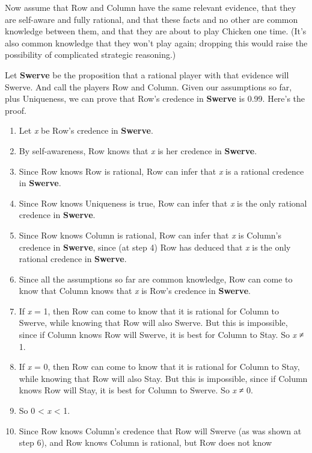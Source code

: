 \documentclass[
  12pt,
  letterpaper,
  DIV=11,
  numbers=noendperiod]{scrreprt}
\providecommand{\tightlist}{%
  \setlength{\itemsep}{0pt}\setlength{\parskip}{0pt}}\usepackage{longtable,booktabs,array}
\begin{document}
Now assume that Row and Column have the same relevant evidence, that
they are self-aware and fully rational, and that these facts and no
other are common knowledge between them, and that they are about to play
Chicken one time. (It's also common knowledge that they won't play
again; dropping this would raise the possibility of complicated
strategic reasoning.)

Let \textbf{Swerve} be the proposition that a rational player with that
evidence will Swerve. And call the players Row and Column. Given our
assumptions so far, plus Uniqueness, we can prove that Row's credence in
\textbf{Swerve} is 0.99. Here's the proof.

\begin{enumerate}
\def\labelenumi{\arabic{enumi}.}
\tightlist
\item
  Let \emph{x} be Row's credence in \textbf{Swerve}.
\item
  By self-awareness, Row knows that \emph{x} is her credence in
  \textbf{Swerve}.
\item
  Since Row knows Row is rational, Row can infer that \emph{x} is a
  rational credence in \textbf{Swerve}.
\item
  Since Row knows Uniqueness is true, Row can infer that \emph{x} is the
  only rational credence in \textbf{Swerve}.
\item
  Since Row knows Column is rational, Row can infer that \emph{x} is
  Column's credence in \textbf{Swerve}, since (at step 4) Row has
  deduced that \emph{x} is the only rational credence in
  \textbf{Swerve}.
\item
  Since all the assumptions so far are common knowledge, Row can come to
  know that Column knows that \emph{x} is Row's credence in
  \textbf{Swerve}.
\item
  If \emph{x} = 1, then Row can come to know that it is rational for
  Column to Swerve, while knowing that Row will also Swerve. But this is
  impossible, since if Column knows Row will Swerve, it is best for
  Column to Stay. So \emph{x} ≠ 1.
\item
  If \emph{x} = 0, then Row can come to know that it is rational for
  Column to Stay, while knowing that Row will also Stay. But this is
  impossible, since if Column knows Row will Stay, it is best for Column
  to Swerve. So \emph{x} ≠ 0.
\item
  So 0 \textless{} \emph{x} \textless{} 1.
\item
  Since Row knows Column's credence that Row will Swerve (as was shown
  at step 6), and Row knows Column is rational, but Row does not know

\end{enumerate}
\end{document}
